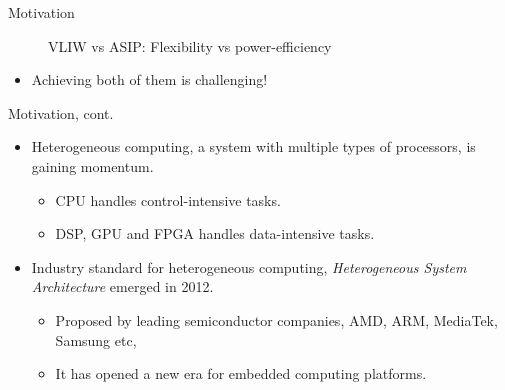 \documentclass{beamer}
\begin{document}
\begin{CJK}{UTF8}{bkai}
\begin{frame}{Motivation}
        \begin{figure}
            \caption{VLIW vs ASIP: Flexibility vs power-efficiency}
            \begin{center}
            \end{center}
        \end{figure}
        \begin{itemize}
            \item {
                   Achieving both of them is challenging! 
                }
        \end{itemize}
    \end{frame}

    \begin{frame}{Motivation, cont.}
        \begin{itemize}
            \item {
                    Heterogeneous computing, a system with multiple types of processors, is gaining momentum.
                    \begin{itemize}
                        \item {
                                CPU handles control-intensive tasks.
                            }
                        \item {
                                DSP, GPU and FPGA handles data-intensive tasks.
                            }
                        \end{itemize}
                }
            \item {
                    Industry standard for heterogeneous computing, \textit{Heterogeneous System Architecture} emerged in 2012.
                    \begin{itemize}
                        \item {
                                Proposed by leading semiconductor companies, AMD, ARM, MediaTek, Samsung etc, 
                            }
                        \item {
                                It has opened a new era for embedded computing platforms.
                            }
                        \end{itemize}
                }
        \end{itemize}
    \end{frame}



\end{CJK}
\end{document}
